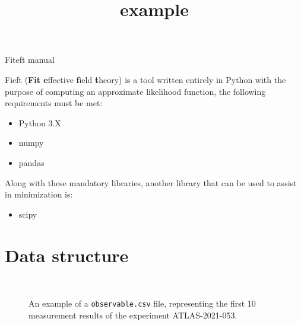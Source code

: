 \documentclass[12pt]{article}
\title{example}
\newlength{\mywidth}\setlength{\mywidth}{14.5cm}
\begin{document}
\fontsize{20pt}{\baselineskip}\selectfont
\begin{center}
  Fiteft manual
\end{center}
\fontsize{12pt}{\baselineskip}\selectfont
\tableofcontents
\clearpage
Fieft (\textbf{Fit e}ffective \textbf{f}ield \textbf{t}heory) is a tool written entirely in Python with the purpose of computing an approximate likelihood function, the following requirements must be met:
\begin{itemize}
  \item Python 3.X
  \item numpy
  \item pandas
\end{itemize}
Along with these mandatory libraries, another library that can be used to assist in minimization is:
\begin{itemize}
  \item scipy
\end{itemize}
 \section{Data structure}
 \begin{figure}
   \resizebox{\textwidth}{!}{
     
     }\\
     \caption{An example of a \texttt{observable.csv} file, representing the first 10 measurement results of the experiment ATLAS-2021-053\cite{ATLAS:2021vrm}.}
 \end{figure}
 
\end{document}
